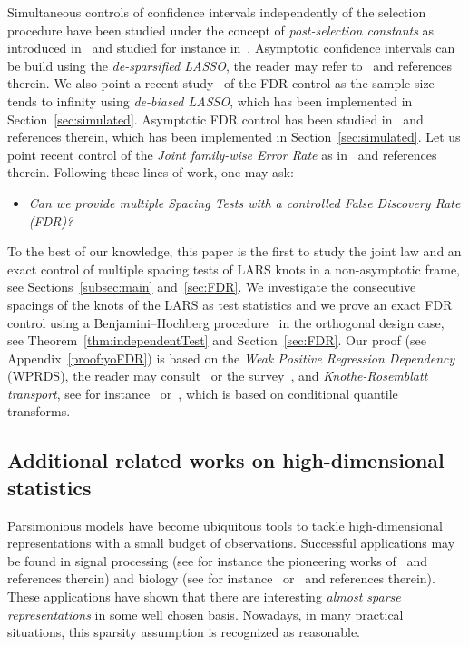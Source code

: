 \documentclass[final,numbib]{imaiai}%
\numberwithin{equation}{section}
\newcommand{\<}{\langle}
\renewcommand{\>}{\rangle}
\newcommand{\1}{\mathds{1}}
\begin{document}
{{{Simultaneous controls of confidence intervals independently of the selection procedure have been studied under the concept of {\it post-selection constants} as introduced in~\cite{berk2013valid} and studied for instance in~\cite{bachoc2018post}.
Asymptotic confidence intervals can be build using the {\it de-sparsified LASSO}, the reader may refer to~\cite[Chapter 5]{van2016estimation} and references therein.
We also point a recent study~\citep{javanmard2019false} of the FDR control as the sample size tends to infinity using {\it de-biased LASSO}, which has been implemented in Section~\ref{sec:simulated}.
Asymptotic FDR control has been studied in~\cite{barber2015controlling} and references therein, which has been implemented in Section~\ref{sec:simulated}.
Let us point recent control of the {\it Joint family-wise Error Rate} as in~\cite{blanchard2017post} and references therein.
Following these lines of work, one may ask:
\begin{itemize}
\item[\bf{[Q6]}]
{\it 
Can we provide {multiple} Spacing Tests with a controlled False Discovery Rate (FDR)?}
\end{itemize}
To the best of our knowledge, this paper is the first to study the joint law and an exact control of multiple spacing tests of LARS knots in a non-asymptotic frame, see Sections~\ref{subsec:main} and~\ref{sec:FDR}.
We investigate the consecutive spacings of the knots of the LARS as test statistics and we prove an exact FDR control using a Benjamini–Hochberg procedure~\citep{benjamini1995controlling} in the orthogonal design case, see Theorem~\ref{thm:independentTest} and Section~\ref{sec:FDR}.
Our proof (see Appendix~\ref{proof:yoFDR}) is based on the {\it Weak Positive Regression Dependency} (WPRDS), the reader may consult~\cite{blanchard2008two} or the survey~\cite{roquain2010type}, and {\it Knothe-Rosemblatt transport}, see for instance~\cite[Sec.2.3, Page 67]{santambrogio2015optimal} or~\cite[Page 20]{villani2008optimal}, which is based on conditional quantile transforms.

\subsection{Additional related works on high-dimensional statistics}
Parsimonious models have become ubiquitous tools to tackle high-dimensional representations with a small budget of observations.
Successful applications may be found in signal processing (see for instance the pioneering works of~\cite{Chen_Donoho_Saunders98,Candes_Romberg_Tao06} and references therein) and biology (see for instance~\cite{barber2015controlling} or~\cite[Chapter~1.4]{Buhlmann_vandeGeer11} and references therein).
These applications have shown that there are interesting {\it almost sparse representations} in some well chosen basis.
Nowadays, in many practical situations, this sparsity assumption is recognized as reasonable.

}}}
\end{document}
